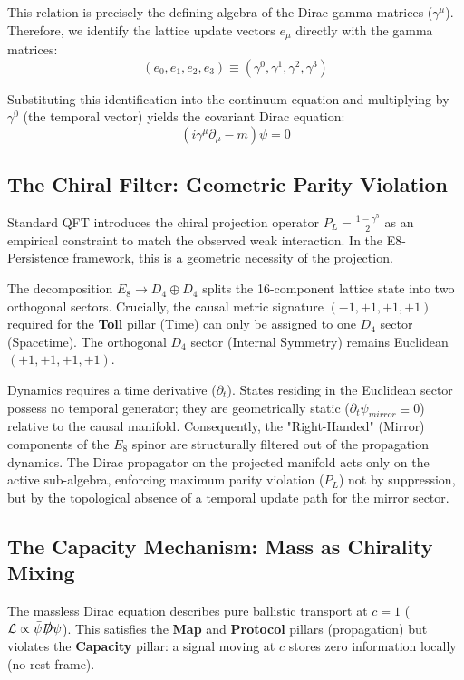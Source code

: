 This relation is precisely the defining algebra of the Dirac gamma matrices ($\gamma^\mu$). Therefore, we identify the lattice update vectors $e_\mu$ directly with the gamma matrices:
\begin{equation}
    (e_0, e_1, e_2, e_3) \equiv (\gamma^0, \gamma^1, \gamma^2, \gamma^3)
\end{equation}

Substituting this identification into the continuum equation and multiplying by $\gamma^0$ (the temporal vector) yields the covariant Dirac equation:
\begin{equation}
    (i\gamma^\mu \partial_\mu - m)\psi = 0
\end{equation}

\subsection{The Chiral Filter: Geometric Parity Violation}
Standard QFT introduces the chiral projection operator $P_L = \frac{1-\gamma^5}{2}$ as an empirical constraint to match the observed weak interaction. In the E8-Persistence framework, this is a geometric necessity of the projection.

The decomposition $E_8 \to D_4 \oplus D_4$ splits the 16-component lattice state into two orthogonal sectors. Crucially, the causal metric signature $(-1, +1, +1, +1)$ required for the \textbf{Toll} pillar (Time) can only be assigned to one $D_4$ sector (Spacetime). The orthogonal $D_4$ sector (Internal Symmetry) remains Euclidean $(+1, +1, +1, +1)$.

Dynamics requires a time derivative ($\partial_t$). States residing in the Euclidean sector possess no temporal generator; they are geometrically static ($\partial_t \psi_{mirror} \equiv 0$) relative to the causal manifold. Consequently, the "Right-Handed" (Mirror) components of the $E_8$ spinor are structurally filtered out of the propagation dynamics.
The Dirac propagator on the projected manifold acts only on the active sub-algebra, enforcing maximum parity violation ($P_L$) not by suppression, but by the topological absence of a temporal update path for the mirror sector.

\subsection{The Capacity Mechanism: Mass as Chirality Mixing}
The massless Dirac equation describes pure ballistic transport at $c=1$ ($\mathcal{L} \propto \bar{\psi} \slashed{D} \psi$). This satisfies the \textbf{Map} and \textbf{Protocol} pillars (propagation) but violates the \textbf{Capacity} pillar: a signal moving at $c$ stores zero information locally (no rest frame).

